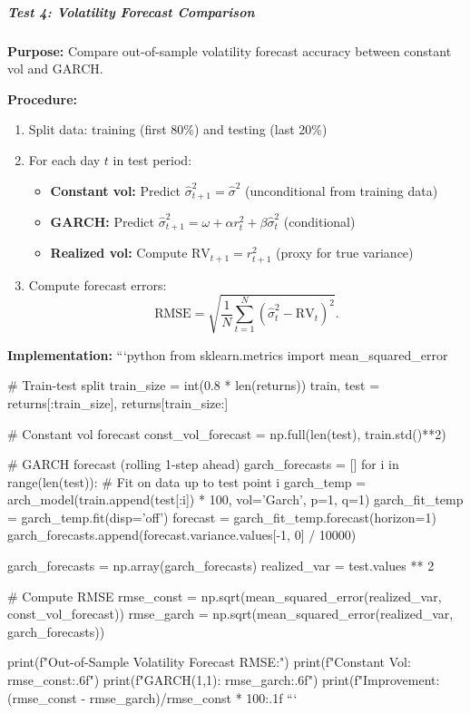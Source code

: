 \subparagraph{Test 4: Volatility Forecast Comparison}

\textbf{Purpose:} Compare out-of-sample volatility forecast accuracy between constant vol and GARCH.

\textbf{Procedure:}

\begin{enumerate}
	\item Split data: training (first 80\%) and testing (last 20\%)
	\item For each day $t$ in test period:
	\begin{itemize}
		\item \textbf{Constant vol:} Predict $\hat{\sigma}_{t+1}^2 = \hat{\sigma}^2$ (unconditional from training data)
		\item \textbf{GARCH:} Predict $\hat{\sigma}_{t+1}^2 = \omega + \alpha r_t^2 + \beta \hat{\sigma}_t^2$ (conditional)
		\item \textbf{Realized vol:} Compute $\text{RV}_{t+1} = r_{t+1}^2$ (proxy for true variance)
	\end{itemize}
	\item Compute forecast errors:
	\begin{equation}
		\text{RMSE} = \sqrt{\frac{1}{N} \sum_{t=1}^N (\hat{\sigma}_t^2 - \text{RV}_t)^2}.
	\end{equation}
\end{enumerate}

\textbf{Implementation:}
```python
from sklearn.metrics import mean_squared_error

# Train-test split
train_size = int(0.8 * len(returns))
train, test = returns[:train_size], returns[train_size:]

# Constant vol forecast
const_vol_forecast = np.full(len(test), train.std()**2)

# GARCH forecast (rolling 1-step ahead)
garch_forecasts = []
for i in range(len(test)):
# Fit on data up to test point i
garch_temp = arch_model(train.append(test[:i]) * 100, vol='Garch', p=1, q=1)
garch_fit_temp = garch_temp.fit(disp='off')
forecast = garch_fit_temp.forecast(horizon=1)
garch_forecasts.append(forecast.variance.values[-1, 0] / 10000)

garch_forecasts = np.array(garch_forecasts)
realized_var = test.values ** 2

# Compute RMSE
rmse_const = np.sqrt(mean_squared_error(realized_var, const_vol_forecast))
rmse_garch = np.sqrt(mean_squared_error(realized_var, garch_forecasts))

print(f"Out-of-Sample Volatility Forecast RMSE:")
print(f"Constant Vol: {rmse_const:.6f}")
print(f"GARCH(1,1):   {rmse_garch:.6f}")
print(f"Improvement:  {(rmse_const - rmse_garch)/rmse_const * 100:.1f}%
```

